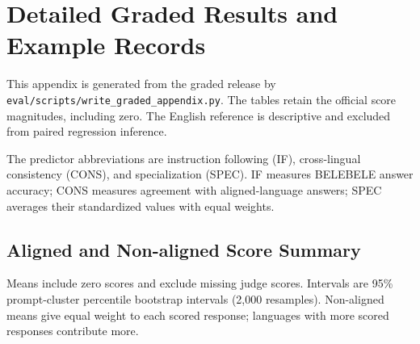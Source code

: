 \chapter{Detailed Graded Results and Example Records}

\label{app:graded-details}

This appendix is generated from the graded release by \texttt{eval/scripts/write\_graded\_appendix.py}. The tables retain the official score magnitudes, including zero. The English reference is descriptive and excluded from paired regression inference.

The predictor abbreviations are instruction following (IF), cross-lingual consistency (CONS), and specialization (SPEC). IF measures BELEBELE answer accuracy; CONS measures agreement with aligned-language answers; SPEC averages their standardized values with equal weights.

\section{Aligned and Non-aligned Score Summary}

Means include zero scores and exclude missing judge scores. Intervals are 95\% prompt-cluster percentile bootstrap intervals (2,000 resamples). Non-aligned means give equal weight to each scored response; languages with more scored responses contribute more.

\begingroup\footnotesize\setlength{\tabcolsep}{3pt}\renewcommand{\arraystretch}{1.12}

